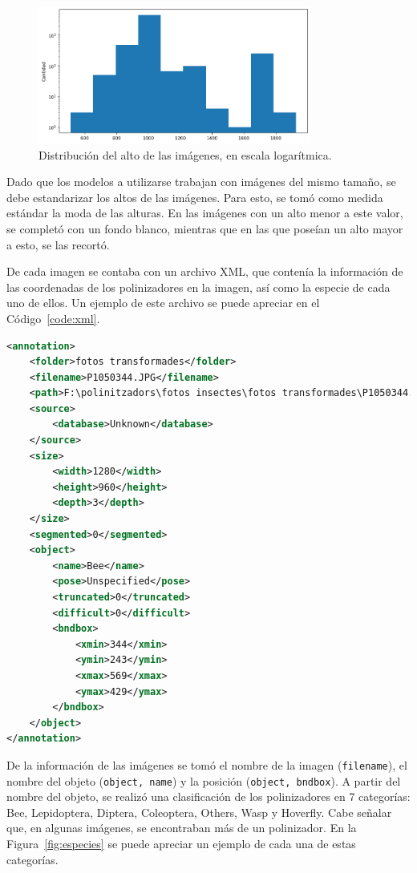 \begin{figure}[H]
    \centering
    \includegraphics[width=0.8\textwidth]{Figuras/dimensiones.png}
    \caption{Distribución del alto de las imágenes, en escala logarítmica.}
    \label{fig:dimensiones}
\end{figure}

Dado que los modelos a utilizarse trabajan con imágenes del mismo tamaño, se debe estandarizar los altos de las imágenes. Para esto, se tomó como medida estándar la moda de las alturas. En las imágenes con un alto menor a este valor, se completó con un fondo blanco, mientras que en las que poseían un alto mayor a esto, se las recortó.

De cada imagen se contaba con un archivo XML, que contenía la información de las coordenadas de los polinizadores en la imagen, así como la especie de cada uno de ellos. Un ejemplo de este archivo se puede apreciar en el Código~\ref{code:xml}.

\begin{lstlisting}[language=XML, caption={Ejemplo de archivo XML de información de imágenes.}, label={code:xml}]
    <annotation>
	<folder>fotos transformades</folder>
	<filename>P1050344.JPG</filename>
	<path>F:\polinitzadors\fotos insectes\fotos transformades\P1050344.JPG</path>
	<source>
		<database>Unknown</database>
	</source>
	<size>
		<width>1280</width>
		<height>960</height>
		<depth>3</depth>
	</size>
	<segmented>0</segmented>
	<object>
		<name>Bee</name>
		<pose>Unspecified</pose>
		<truncated>0</truncated>
		<difficult>0</difficult>
		<bndbox>
			<xmin>344</xmin>
			<ymin>243</ymin>
			<xmax>569</xmax>
			<ymax>429</ymax>
		</bndbox>
	</object>
</annotation>
\end{lstlisting}

De la información de las imágenes se tomó el nombre de la imagen (\texttt{filename}), el nombre del objeto (\texttt{object, name}) y la posición (\texttt{object, bndbox}). A partir del nombre del objeto, se realizó una clasificación de los polinizadores en 7 categorías: Bee, Lepidoptera, Diptera, Coleoptera, Others, Wasp y Hoverfly. Cabe señalar que, en algunas imágenes, se encontraban más de un polinizador. En la Figura~\ref{fig:especies} se puede apreciar un ejemplo de cada una de estas categorías.

